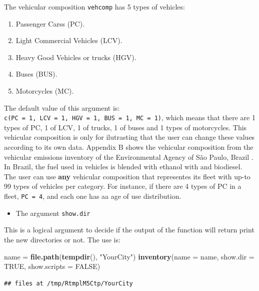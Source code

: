 \documentclass[12pt,graybox,envcountchap,sectrefs]{krantz}
\makeatletter
\newenvironment{Shaded}{\begin{snugshade}}{\end{snugshade}}
\newcommand{\KeywordTok}[1]{\textcolor[rgb]{0.13,0.29,0.53}{\textbf{#1}}}
\newcommand{\DataTypeTok}[1]{\textcolor[rgb]{0.13,0.29,0.53}{#1}}
\newcommand{\StringTok}[1]{\textcolor[rgb]{0.31,0.60,0.02}{#1}}
\newcommand{\OtherTok}[1]{\textcolor[rgb]{0.56,0.35,0.01}{#1}}
\newcommand{\NormalTok}[1]{#1}
\providecommand{\tightlist}{%
  \setlength{\itemsep}{0pt}\setlength{\parskip}{0pt}}
\newenvironment{kframe}{%
\medskip{}
\setlength{\fboxsep}{.8em}
 \def\at@end@of@kframe{}%
 \ifinner\ifhmode%
  \def\at@end@of@kframe{\end{minipage}}%
  \begin{minipage}{\columnwidth}%
 \fi\fi%
 \def\FrameCommand##1{\hskip\@totalleftmargin \hskip-\fboxsep
 \colorbox{shadecolor}{##1}\hskip-\fboxsep
     \hskip-\linewidth \hskip-\@totalleftmargin \hskip\columnwidth}%
 \MakeFramed {\advance\hsize-\width
   \@totalleftmargin\z@ \linewidth\hsize
   \@setminipage}}%
 {\par\unskip\endMakeFramed%
 \at@end@of@kframe}
\renewenvironment{Shaded}{\begin{kframe}}{\end{kframe}}
\theoremstyle{definition}
\theoremstyle{definition}
\theoremstyle{definition}
\theoremstyle{remark}
\makeatother
\begin{document}
The vehicular composition \texttt{vehcomp} has 5 types of vehicles:

\begin{enumerate}
\def\labelenumi{\arabic{enumi}.}
\tightlist
\item
  Passenger Carss (PC).
\item
  Light Commercial Vehicles (LCV).
\item
  Heavy Good Vehicles or trucks (HGV).
\item
  Buses (BUS).
\item
  Motorcycles (MC).
\end{enumerate}

The default value of this argument is:
\texttt{c(PC\ =\ 1,\ LCV\ =\ 1,\ HGV\ =\ 1,\ BUS\ =\ 1,\ MC\ =\ 1)},
which means that there are 1 types of PC, 1 of LCV, 1 of trucks, 1 of
buses and 1 types of motorcycles. This vehicular composition is only for
ilutrasting that the user can change these values according to its own
data. Appendix B shows the vehicular composition from the vehicular
emissions inventory of the Environmental Agency of São Paulo, Brazil
\citep{CETESB2015}. In Brazil, the fuel used in vehicles is blended with
ethanol with and biodiesel. The user can use \textbf{any} vehicular
composition that representes its fleet with up-to 99 types of vehicles
per category. For instance, if there are 4 types of PC in a fleet,
\texttt{PC\ =\ 4}, and each one has aa age of use distribution.

\begin{itemize}
\tightlist
\item
  The argument \texttt{show.dir}
\end{itemize}

This is a logical argument to decide if the output of the function will
return print the new directories or not. The use is:

\begin{Shaded}
\begin{Highlighting}[]
\NormalTok{name =}\StringTok{ }\KeywordTok{file.path}\NormalTok{(}\KeywordTok{tempdir}\NormalTok{(), }\StringTok{"YourCity"}\NormalTok{)}
\KeywordTok{inventory}\NormalTok{(}\DataTypeTok{name =}\NormalTok{ name, }\DataTypeTok{show.dir =} \OtherTok{TRUE}\NormalTok{, }\DataTypeTok{show.scripts =} \OtherTok{FALSE}\NormalTok{)}
\end{Highlighting}
\end{Shaded}

\begin{verbatim}
## files at /tmp/RtmplM5Ctp/YourCity
\end{verbatim}
\end{document}
